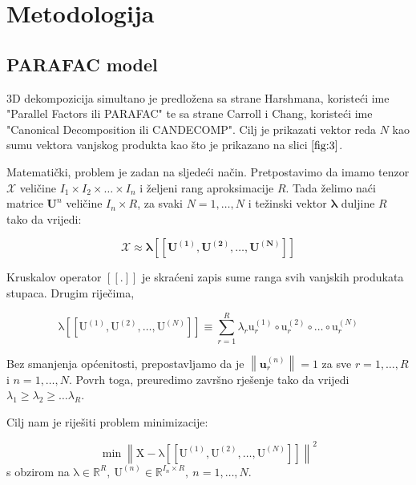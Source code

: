 \documentclass[11pt]{article}
\newcommand{\norm}[1]{\left\lVert#1\right\rVert}
\begin{document}
\newpage
\section{Metodologija}
\subsection{PARAFAC model}
3D dekompozicija simultano je predložena sa strane Harshmana, koristeći ime "Parallel Factors ili PARAFAC" te sa strane Carroll i Chang, koristeći ime "Canonical Decomposition ili CANDECOMP".
Cilj je prikazati vektor reda $N$ kao sumu vektora vanjskog produkta kao što je prikazano na slici $\ref{fig:3}$.

Matematički, problem je zadan na sljedeći način.
Pretpostavimo da imamo tenzor $\boldsymbol{\mathcal{X}}$ veličine $I_{1} \times I_{2} \times \ldots \times I_{n}$ i željeni rang aproksimacije $R$. Tada želimo naći matrice $\boldsymbol{U} ^{n}$ veličine $I_{n} \times R$, za svaki $N = 1, \ldots, N$ i težinski vektor $\boldsymbol{\lambda}$ duljine $R$ tako da vrijedi:

\begin{equation}
    \boldsymbol{\mathcal{X} \approx \lambda [\![ U^{(1)}, U^{(2)}, \ldots, U^{(N)} ]\!] }
\end{equation}

Kruskalov operator $[\![.]\!]$ je skraćeni zapis sume ranga svih vanjskih produkata stupaca. Drugim riječima, 

\begin{equation}
    \mathrm{\lambda}[[\mathrm{U}^{(1)}, \mathrm{U}^{(2)}, \dots , \mathrm{U}^{(N)}]] \equiv \displaystyle\sum_{r=1}^{R} \lambda_{r} \mathrm{u}_{r}^{(1)} \circ \mathrm{u}_{r}^{(2)} \circ \dots \circ \mathrm{u}_{r}^{(N)}
\end{equation}

Bez smanjenja općenitosti, prepostavljamo da je $ \norm{\boldsymbol{u}_{r}^{(n)}} = 1$ za sve $r = 1, \ldots, R $ i $ n = 1, \ldots, N$. Povrh toga, preuredimo završno rješenje tako da vrijedi $\lambda_{1} \geq \lambda_{2} \geq \ldots \lambda_{R}$.

Cilj nam je riješiti problem minimizacije:

\begin{equation}
    \min \left\| \mathrm{X} - \mathrm{\lambda}[[\mathrm{U}^{(1)}, \mathrm{U}^{(2)}, \dots , \mathrm{U}^{(N)}]] \right\|^{2}
\end{equation}
s obzirom na $\mathrm{\lambda} \in \mathbb{R}^{R},~\mathrm{U}^{(n)} \in \mathbb{R}^{I_{n}\times R},~ n = 1,\dots , N$.
\end{document}
